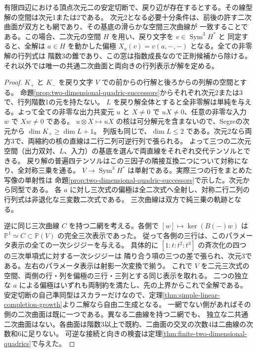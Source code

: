\begin{corollary}\label{cor:two-dimensional-return-pencil}
有限四辺における頂点次元二の安定切断で、戻り辺が存在するとする。その線型解の空間は次元1または2である。
次元2となる必要十分条件は、前後の許す二次曲面が双方とも網であり、その基底の滑らかな空間三次曲線が
一致することである。この場合、二次元の空間 $H$ を用い、戻り文字を $v\in\operatorname{Sym}^3 H^*$ と
同定すると、全解は $a\in H$ を動かした偏極 $X_a(v)=v(a,-,-)$ となる。全ての非零解の行列式は
階数3の錐であり、この窓は指数成長なので正則候補から除ける。
それ以外では唯一の共通二次曲面と両向きの行列表示が解を定める。
\end{corollary}
\begin{proof}
$K_+$ と $K_-$ を戻り文字 $V$ での前からの行解と後ろからの列解の空間とする。
命題\ref{prop:two-dimensional-quadric-successors}からそれぞれ次元2または3で、行列階数1の元を持たない。
$L$ を戻り解全体とすると全非零解は単純を与える。よって全ての非零な出力共変元 $u$ と $X\ne0$ で
$uX\ne0$、任意の非零な入力 $w$ で $Xw\ne0$ である。
$u\otimes X\mapsto uX$ の核は可分解元を含まないので、Segreの次元から $\dim K_+\ge\dim L+1$。
列版も同じで、$\dim L\le2$ である。次元2なら両方3で、両縮約の核の直線は二行二列可逆行列で張られる。
よって三つの二次元空間（出力双対、$L$、入力）の基底を選んで両直線をそれぞれ交代テンソルとできる。
戻り解の普遍四テンソルはこの三因子の隣接互換二つについて対称になり、全対称三乗を通る。
$V\to\operatorname{Sym}^3 H^*$ は単射である。実際三つの行をまとめた写像の単射性は
命題\ref{prop:two-dimensional-quadric-successors}で示した。次元から同型である。
各 $a$ に対し三次式の偏極は全二次式へ全射し、対称二行二列の行列式は非退化な三変数二次式である。
三次曲線は双方で純三乗の軌跡となる。

逆に同じ三次曲線 $C$ を持つ二網を考える。各側で $[w]\mapsto\ker(B(-)w)$ は
$\mathbb P^1\simeq C\subset\mathbb P(V)$ の完全三次表示であった。
従って各側の三行は、このパラメータ表示の全ての一次シジジーを与える。
具体的に $[1:t:t^2:t^3]$ の斉次化の四つの三次単項式に対する一次シジジーは
隣り合う項の三つの差で張られ、次元3である。左右のパラメータ表示は射影一次変換で揃う。
これで $V$ を二元三次式の空間、両側の行・列を偏極の三行・三列とする同じ表示を取れる。
二つの独立な $a$ による偏極はいずれも両制約を満たし、先の上界からこれで全解である。
安定切断の自己準同型はスカラーだけなので、定理\ref{thm:simple-linear-completion-growth}より二解なら自由二生成となる。
一網でない側があればその側の二次曲面は既に一つである。異なる二曲線を持つ二網でも、
独立な二共通二次曲面はない。各曲面は階数3以上で既約、二曲面の交叉の次数4は二曲線の次数和6に足りない。
可逆な接続と向きの検査は定理\ref{thm:finite-two-dimensional-quadrics}で与えた。
\end{proof}
